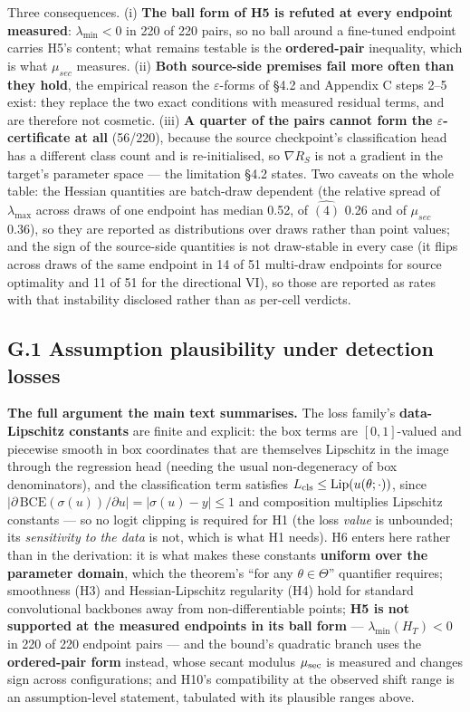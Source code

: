 \documentclass[pdflatex,sn-mathphys-ay]{sn-jnl}
\begin{document}
Three consequences. (i) \textbf{The ball form of H5 is refuted at every endpoint measured}: $\lambda_{\min}<0$ in 220 of 220 pairs, so no ball around a fine-tuned endpoint carries H5's content; what remains testable is the \textbf{ordered-pair} inequality, which is what $\mu_{sec}$ measures. (ii) \textbf{Both source-side premises fail more often than they hold}, the empirical reason the $\varepsilon$-forms of \S{}4.2 and Appendix C steps 2--5 exist: they replace the two exact conditions with measured residual terms, and are therefore not cosmetic. (iii) \textbf{A quarter of the pairs cannot form the $\varepsilon$-certificate at all} (56/220), because the source checkpoint's classification head has a different class count and is re-initialised, so $\nabla R_S$ is not a gradient in the target's parameter space --- the limitation \S{}4.2 states. Two caveats on the whole table: the Hessian quantities are batch-draw dependent (the relative spread of $\lambda_{\max}$ across draws of one endpoint has median 0.52, of $\widehat{(4)}$ 0.26 and of $\mu_{sec}$ 0.36), so they are reported as distributions over draws rather than point values; and the sign of the source-side quantities is not draw-stable in every case (it flips across draws of the same endpoint in 14 of 51 multi-draw endpoints for source optimality and 11 of 51 for the directional VI), so those are reported as rates with that instability disclosed rather than as per-cell verdicts.

\subsection*{G.1 Assumption plausibility under detection losses}

\textbf{The full argument the main text summarises.} The loss family's \textbf{data-Lipschitz constants} are finite and explicit: the box terms are $[0,1]$-valued and piecewise smooth in box coordinates that are themselves Lipschitz in the image through the regression head (needing the usual non-degeneracy of box denominators), and the classification term satisfies $L_{\rm cls}\le\mathrm{Lip}(u(\theta;\cdot))$, since $|\partial\,\mathrm{BCE}(\sigma(u))/\partial u|=|\sigma(u)-y|\le1$ and composition multiplies Lipschitz constants --- so no logit clipping is required for H1 (the loss \emph{value} is unbounded; its \emph{sensitivity to the data} is not, which is what H1 needs). H6 enters here rather than in the derivation: it is what makes these constants \textbf{uniform over the parameter domain}, which the theorem's ``for any $\theta\in\Theta$'' quantifier requires; smoothness (H3) and Hessian-Lipschitz regularity (H4) hold for standard convolutional backbones away from non-differentiable points; \textbf{H5 is not supported at the measured endpoints in its ball form} --- $\lambda_{\min}(H_T)<0$ in 220 of 220 endpoint pairs --- and the bound's quadratic branch uses the \textbf{ordered-pair form} instead, whose secant modulus $\mu_{\rm sec}$ is measured and changes sign across configurations; and H10's compatibility at the observed shift range is an assumption-level statement, tabulated with its plausible ranges above.
\end{document}
